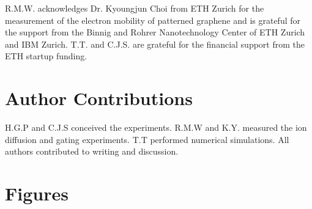 \documentclass[journal=nalefd,email=true, hyperref=true, keywords=false]{achemso}
\begin{document}
\begin{acknowledgement}
  R.M.W. acknowledges Dr. Kyoungjun Choi from ETH Zurich for the measurement of the electron mobility 
  of patterned graphene and is grateful for the support from the Binnig and Rohrer
  Nanotechnology Center of ETH Zurich and IBM Zurich. T.T. and
  C.J.S. are grateful for the financial support from the ETH startup
  funding. 
\end{acknowledgement}

\section{Author Contributions}
\label{sec:author}

H.G.P and C.J.S conceived the experiments. R.M.W and K.Y. measured the ion
diffusion and gating experiments. T.T performed numerical
simulations. All authors contributed to writing and discussion.


\section*{}
\label{sec:ref}



\clearpage
\section{Figures}
\label{sec:figs}
\end{document}
